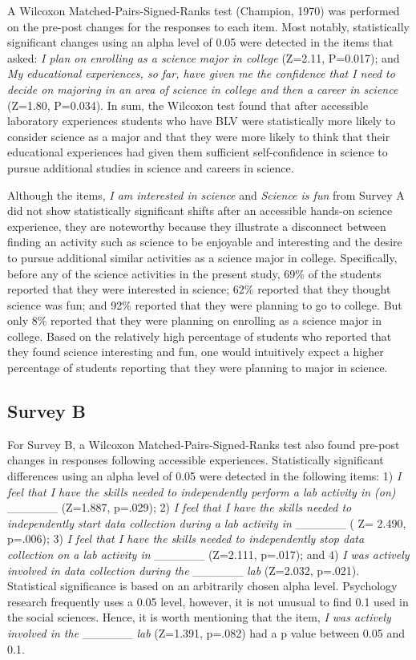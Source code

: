 \documentclass[11.5pt]{sig-alternate} %
\begin{document}
\begin{large}
A Wilcoxon Matched-Pairs-Signed-Ranks test (Champion, 1970) was performed on the pre-post changes for the responses to each item. Most notably, statistically significant changes using an alpha level of 0.05 were detected in the items that asked: \textit{I plan on enrolling as a science major in college} (Z=2.11, P=0.017); and \textit{My educational experiences, so far, have given me the confidence that I need to decide on majoring in an area of science in college and then a career in science} (Z=1.80, P=0.034). In sum, the Wilcoxon test found that after accessible laboratory experiences students who have BLV were statistically more likely to consider science as a major and that they were more likely to think that their educational experiences had given them sufficient self-confidence in science to pursue additional studies in science and careers in science.

Although the items, \textit{I am interested in science} and \textit{Science is fun} from Survey A did not show statistically significant shifts after an accessible hands-on science experience, they are noteworthy because they illustrate a disconnect between finding an activity such as science to be enjoyable and interesting and the desire to pursue additional similar activities as a science major in college. Specifically, before any of the science activities in the present study, 69\% of the students reported that they were interested in science; 62\% reported that they thought science was fun; and 92\% reported that they were planning to go to college. But only 8\% reported that they were planning on enrolling as a science major in college. Based on the relatively high percentage of students who reported that they found science interesting and fun, one would intuitively expect a higher percentage of students reporting that they were planning to major in science. 

\subsection*{Survey B}

For Survey B, a Wilcoxon Matched-Pairs-Signed-Ranks test also found pre-post changes in responses following accessible experiences. Statistically significant differences using an alpha level of 0.05 were detected in the following items: 1) \textit{I feel that I have the skills needed to independently perform a lab activity in (on)} \_\_\_\_\_\_ (Z=1.887, p=.029); 2) \textit{I feel that I have the skills needed to independently start data collection during a lab activity in} \_\_\_\_\_\_ ( Z= 2.490, p=.006); 3) \textit{I feel that I have the skills needed to independently stop data collection on a lab activity in} \_\_\_\_\_\_ (Z=2.111, p=.017); and 4) \textit{I was actively involved in data collection during the} \_\_\_\_\_\_ \textit{lab} (Z=2.032, p=.021). Statistical significance is based on an arbitrarily chosen alpha level. Psychology research frequently uses a 0.05 level, however, it is not unusual to find 0.1 used in the social sciences. Hence, it is worth mentioning that the item,  \textit{I was actively involved in the} \_\_\_\_\_\_ \textit{lab} (Z=1.391, p=.082) had a p value between 0.05 and 0.1.       


\end{large}
\end{document}

